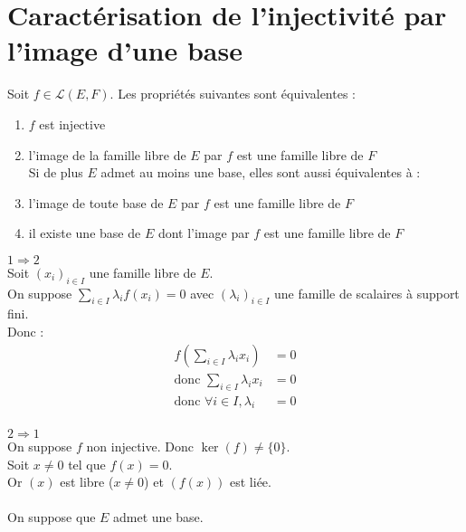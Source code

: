 \documentclass[../main.tex]{subfiles}
\begin{document}
\section{Caractérisation de l'injectivité par l'image d'une base}
\begin{tcolorbox}[title=Propostion 21.68, title filled=false, colframe=lightblue, colback=lightblue!10!white]
    Soit $f\in \mathcal{L}(E, F)$. Les propriétés suivantes sont équivalentes : 
    \begin{enumerate}
        \item $f$ est injective
        \item l'image de la famille libre de $E$ par $f$ est une famille libre de $F$ \\
        Si de plus $E$ admet au moins une base, elles sont aussi équivalentes à : 
        \item l'image de toute base de $E$ par $f$ est une famille  libre de $F$
        \item il existe une base de $E$ dont l'image par $f$ est une famille libre de $F$
    \end{enumerate}
\end{tcolorbox}

$\boxed{1 \Rightarrow 2}$ \\
Soit $(x_i)_{i\in I}$ une famille libre de $E$. \\
On suppose $\sum\limits_{i\in I} \lambda_i f(x_i) = 0$ avec $(\lambda_i)_{i\in I}$ une famille de scalaires à support fini. \\
Donc : 
\begin{align*}
    f\left(\sum_{i\in I} \lambda_i x_i\right) &= 0 \\
    \text{donc } \sum_{i\in I} \lambda_i x_i &= 0 \\
    \text{donc } \forall i \in I, \lambda_i &= 0
\end{align*} \\

$\boxed{2 \Rightarrow 1}$ \\
On suppose $f$ non injective. Donc $\ker(f) \neq \{0\}$. \\
Soit $x\neq 0$ tel que $f(x) = 0$. \\
Or $(x)$ est libre ($x\neq 0$) et $(f(x))$ est liée. \\ \\

\noindent On suppose que $E$ admet une base. \\ \\
\end{document}
